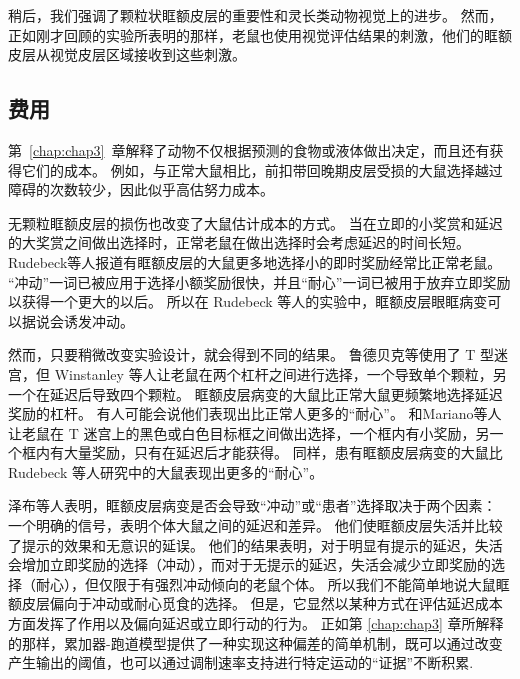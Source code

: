 稍后，我们强调了颗粒状眶额皮层的重要性和灵长类动物视觉上的进步。
然而，正如刚才回顾的实验所表明的那样，老鼠也使用视觉评估结果的刺激，他们的眶额皮层从视觉皮层区域接收到这些刺激。\par



\subsection{费用}

第~\ref{chap:chap3}~章解释了动物不仅根据预测的食物或液体做出决定，而且还有获得它们的成本。
例如，与正常大鼠相比，前扣带回晚期皮层受损的大鼠选择越过障碍的次数较少，因此似乎高估努力成本。\par


无颗粒眶额皮层的损伤也改变了大鼠估计成本的方式。
当在立即的小奖赏和延迟的大奖赏之间做出选择时，正常老鼠在做出选择时会考虑延迟的时间长短。
Rudebeck等人\cite{rudebeck2006separate}报道有眶额皮层的大鼠更多地选择小的即时奖励经常比正常老鼠。
“冲动”一词已被应用于选择小额奖励很快，并且“耐心”一词已被用于放弃立即奖励以获得一个更大的以后。
所以在 Rudebeck 等人的实验中，眶额皮层眼眶病变可以据说会诱发冲动。\par


然而，只要稍微改变实验设计，就会得到不同的结果。
鲁德贝克等使用了 T 型迷宫，但 Winstanley 等人\cite{winstanley2004contrasting}让老鼠在两个杠杆之间进行选择，一个导致单个颗粒，另一个在延迟后导致四个颗粒。
眶额皮层病变的大鼠比正常大鼠更频繁地选择延迟奖励的杠杆。
有人可能会说他们表现出比正常人更多的“耐心”。
和Mariano等人\cite{mariano2009impulsive}让老鼠在 T 迷宫上的黑色或白色目标框之间做出选择，一个框内有小奖励，另一个框内有大量奖励，只有在延迟后才能获得。
同样，患有眶额皮层病变的大鼠比 Rudebeck 等人研究中的大鼠表现出更多的“耐心”。\par


泽布等人\cite{zeeb2010contributions}表明，眶额皮层病变是否会导致“冲动”或“患者”选择取决于两个因素：
一个明确的信号，表明个体大鼠之间的延迟和差异。
他们使眶额皮层失活并比较了提示的效果和无意识的延误。
他们的结果表明，对于明显有提示的延迟，失活会增加立即奖励的选择（冲动），而对于无提示的延迟，失活会减少立即奖励的选择（耐心），但仅限于有强烈冲动倾向的老鼠个体。
所以我们不能简单地说大鼠眶额皮层偏向于冲动或耐心觅食的选择。
但是，它显然以某种方式在评估延迟成本方面发挥了作用以及偏向延迟或立即行动的行为。
正如第 \ref{chap:chap3} 章所解释的那样，累加器-跑道模型提供了一种实现这种偏差的简单机制，既可以通过改变产生输出的阈值，也可以通过调制速率支持进行特定运动的“证据”不断积累. \par


